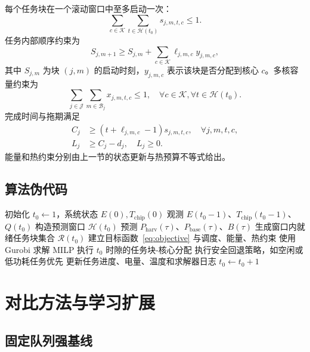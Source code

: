 \documentclass[conference]{IEEEtran}
\newcommand{\rhc}{\texttt{RHC-MILP-Gurobi}}
\begin{document}
每个任务块在一个滚动窗口中至多启动一次：
\begin{equation}
  \sum_{c\in\mathcal{K}}\sum_{t\in\mathcal{H}(t_0)}
  s_{j,m,t,c}\le 1.
\end{equation}
任务内部顺序约束为
\begin{equation}
  S_{j,m+1} \ge S_{j,m}+\sum_{c\in\mathcal{K}}\ell_{j,m,c}y_{j,m,c},
\end{equation}
其中 $S_{j,m}$ 为块 $(j,m)$ 的启动时刻，$y_{j,m,c}$ 表示该块是否分配到核心 $c$。多核容量约束为
\begin{equation}
  \sum_{j\in\mathcal{J}}\sum_{m\in\mathcal{B}_j}x_{j,m,t,c}\le 1,
  \quad \forall c\in\mathcal{K},\forall t\in\mathcal{H}(t_0).
\end{equation}
完成时间与拖期满足
\begin{align}
  C_j &\ge (t+\ell_{j,m,c}-1)s_{j,m,t,c},
  \quad \forall j,m,t,c,\\
  L_j &\ge C_j-d_j,\quad L_j\ge 0.
\end{align}
能量和热约束分别由上一节的状态更新与热预算不等式给出。

\subsection{算法伪代码}

\begin{algorithm}[t]
\caption{\rhc{} 滚动时域调度}
\label{alg:rhc}
\begin{algorithmic}[1]
\State 初始化 $t_0\gets 1$，系统状态 $E(0),T_{\mathrm{chip}}(0)$
  \State 观测 $E(t_0-1)$、$T_{\mathrm{chip}}(t_0-1)$、$Q(t_0)$
  \State 构造预测窗口 $\mathcal{H}(t_0)$
  \State 预测 $P_{\mathrm{harv}}(\tau)$、$P_{\mathrm{base}}(\tau)$、$B(\tau)$
  \State 生成窗口内就绪任务块集合 $\mathcal{R}(t_0)$
  \State 建立目标函数~\eqref{eq:objective} 与调度、能量、热约束
  \State 使用 Gurobi 求解 MILP
    \State 执行 $t_0$ 时隙的任务块-核心分配
  \Else
    \State 执行安全回退策略，如空闲或低功耗任务优先
  \EndIf
  \State 更新任务进度、电量、温度和求解器日志
  \State $t_0\gets t_0+1$
\EndWhile
\end{algorithmic}
\end{algorithm}

\section{对比方法与学习扩展}

\subsection{固定队列强基线}
\end{document}
